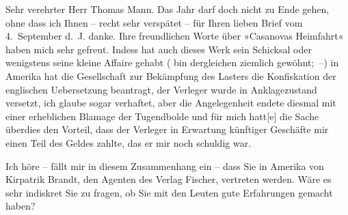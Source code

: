 \pstart{}Sehr verehrter Herr Thomas Mann.\pend\vspace{0.5em}
\pstart
           Das Jahr darf doch nicht zu Ende gehen, ohne dass ich Ihnen – recht sehr verspätet –
               für Ihren lieben Brief vom 4. September d. J. danke. Ihre freundlichen
               Worte über »Casanovas Heimfahrt« haben mich sehr
               gefreut. Indess hat auch dieses Werk sein Schicksal oder wenigstens seine kleine
               Affaire gehabt \introOben{}(\introOben{}\label{T_L02394-1v}\label{T_L02394-1} bin dergleichen
               ziemlich gewöhnt; –\introOben{})\introOben{} in Amerika hat die Gesellschaft zur Bekämpfung
                  des Lasters die Konfiskation der englischen Uebersetzung beantragt, der Verleger wurde in
               Anklagezustand versetzt, ich glaube sogar verhaftet, aber die Angelegenheit endete
               diesmal mit einer erheblichen Blamage der Tugendbolde und für mich
                  hatt{[}e{]} die Sache überdies den Vorteil, dass der Verleger in Erwartung
               künftiger Geschäfte mir einen Teil des Geldes zahlte, das er mir noch schuldig
               war.\pend
           
\pstart
           Ich höre – fällt mir in diesem Zusammenhang ein – dass Sie in Amerika von Kirpatrik {\kaufmannsund} Brandt, den Agenten des Verlag Fischer, vertreten werden. Wäre es sehr indiskret
               Sie zu fragen, ob Sie mit den Leuten gute Erfahrungen gemacht haben?\pend
           
